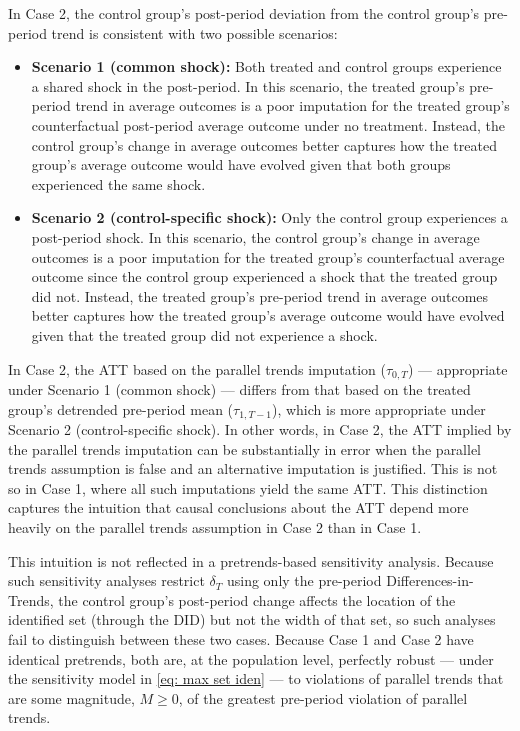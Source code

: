 \documentclass[twoside,11pt]{article}
\begin{document}
In Case 2, the control group's post-period deviation from the control group's pre-period trend is consistent with two possible scenarios:
\begin{itemize}
\item \textbf{Scenario 1 (common shock):} Both treated and control groups experience a shared shock in the post-period. In this scenario, the treated group's pre-period trend in average outcomes is a poor imputation for the treated group's counterfactual post-period average outcome under no treatment. Instead, the control group's change in average outcomes better captures how the treated group's average outcome would have evolved given that both groups experienced the same shock.
\item \textbf{Scenario 2 (control-specific shock):} Only the control group experiences a post-period shock. In this scenario, the control group's change in average outcomes is a poor imputation for the treated group's counterfactual average outcome since the control group experienced a shock that the treated group did not. Instead, the treated group's pre-period trend in average outcomes better captures how the treated group's average outcome would have evolved given that the treated group did not experience a shock.
\end{itemize}

In Case 2, the \textrm{ATT} based on the parallel trends imputation ($\tau_{0,T}$) --- appropriate under Scenario 1 (common shock) --- differs from that based on the treated group's detrended pre-period mean ($\tau_{1,T-1}$), which is more appropriate under Scenario 2 (control-specific shock). In other words, in Case 2, the \textrm{ATT} implied by the parallel trends imputation can be substantially in error when the parallel trends assumption is false and an alternative imputation is justified. This is not so in Case 1, where all such imputations yield the same \textrm{ATT}. This distinction captures the intuition that causal conclusions about the \textrm{ATT} depend more heavily on the parallel trends assumption in Case 2 than in Case 1.

This intuition is not reflected in a pretrends-based sensitivity analysis. Because such sensitivity analyses restrict $\delta_T$ using only the pre-period Differences-in-Trends, the control group's post-period change affects the location of the identified set (through the \textrm{DID}) but not the width of that set, so such analyses fail to distinguish between these two cases. Because Case 1 and Case 2 have identical pretrends, both are, at the population level, perfectly robust --- under the sensitivity model in \eqref{eq: max set iden} --- to violations of parallel trends that are some magnitude, $M \geq 0$, of the greatest pre-period violation of parallel trends.
\end{document}
